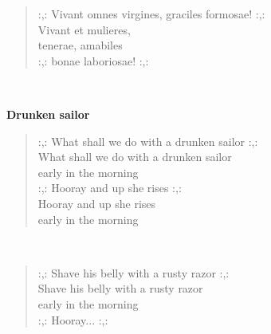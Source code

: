 \noindent\begin{minipage}{\linewidth}
\begin{verse}
	\hspace{0pt-\widthof{:,: }}:,: Vivant omnes virgines, graciles formosae! :,:\\
	Vivant et mulieres,\\
	tenerae, amabiles\\
	\hspace{0pt-\widthof{:,: }}:,: bonae laboriosae! :,:\\
\end{verse}
\end{minipage}\\[10pt]
%
%
\noindent\begin{minipage}{\linewidth}
\vspace{5pt}
\parbox[t]{0.85\linewidth}{\raggedright {\large\bf Drunken sailor}\\[6pt]}
\begin{verse}
	\hspace{0pt-\widthof{:,: }}:,: What shall we do with a drunken sailor :,:\\
	What shall we do with a drunken sailor\\
	early in the morning\\
	\hspace{0pt-\widthof{:,: }}:,: Hooray and up she rises :,:\\
	Hooray and up she rises\\
	early in the morning\\
\end{verse}
\end{minipage}\\[10pt]
\noindent\begin{minipage}{\linewidth}
\begin{verse}
	\hspace{0pt-\widthof{:,: }}:,: Shave his belly with a rusty razor :,:\\
	Shave his belly with a rusty razor\\
	early in the morning\\
	\hspace{0pt-\widthof{:,: }}:,: Hooray... :,:\\
\end{verse}
\end{minipage}\\[10pt]
